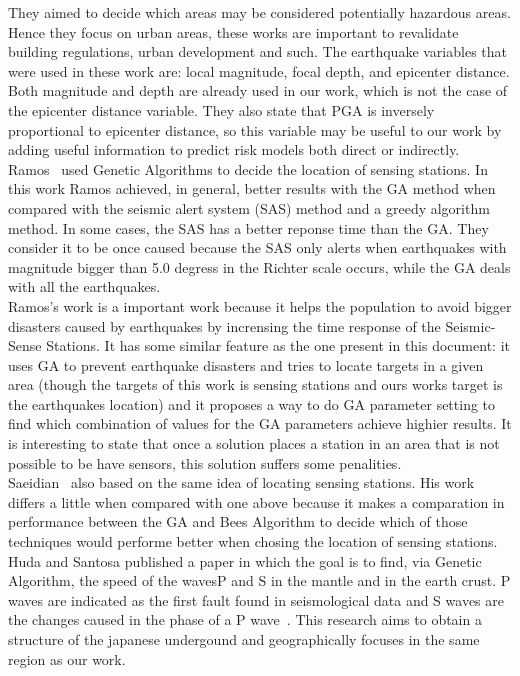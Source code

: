 They aimed to decide which areas may be considered potentially hazardous areas. Hence they focus on urban areas, these works are important to revalidate building regulations, urban development and such. The earthquake variables that were used in these work are: local magnitude, focal depth, and epicenter distance. Both magnitude and depth are already used in our work, which is not the case of the epicenter distance variable. They also state that PGA is inversely proportional to epicenter distance, so this variable may be useful to our work by adding useful information to predict risk models both direct or indirectly.\\
 
Ramos~\cite{Ramos2011} used Genetic Algorithms to decide the location of sensing stations. In this work Ramos achieved, in general, better results with the GA method when compared with the seismic alert system (SAS) method and a greedy algorithm method. In some cases, the SAS has a better reponse time than the GA. They consider it to be once caused because the SAS only alerts when earthquakes with magnitude bigger than 5.0 degress in the Richter scale occurs, while the GA deals with all the earthquakes.\\

Ramos's work is a important work because it helps the population to avoid bigger disasters caused by earthquakes by incrensing the time response of the Seismic-Sense Stations. It has some similar feature as the one present in this document: it uses GA to prevent earthquake disasters and tries to locate targets in a given area (though the targets of this work is sensing stations and ours works target is the earthquakes location) and it proposes a way to do GA parameter setting to find which combination of values for the GA parameters achieve highier results. It is interesting to state that once a solution places a station in an area that is not possible to be have sensors, this solution suffers some penalities.\\

Saeidian~\cite{saeidian2016evaluation} also based on the same idea of locating sensing stations. His work differs a little when compared with one above because it makes a comparation in performance between the GA and Bees Algorithm to decide which of those techniques would performe better when chosing the location of sensing stations.\\

Huda and Santosa \cite{ijse5762} published a paper in which the goal is to find, via Genetic Algorithm, the speed of the wavesP and S in the mantle and in the earth crust. P waves are indicated as the first fault found  in seismological data and S waves are the changes caused in the phase of a P wave~\cite{ijse5762}. This research aims to obtain a structure of the japanese undergound and geographically focuses in the same region as our work.\\